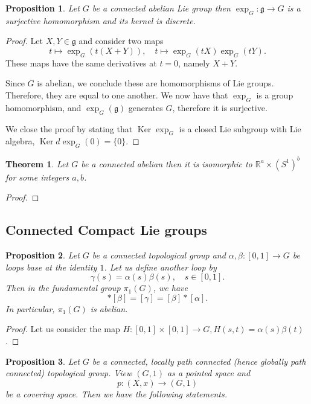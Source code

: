 \documentclass{article}
\newtheorem{theorem}{Theorem}[section]
\newtheorem{proposition}{Proposition}[section]
\numberwithin{equation}{section}
\DeclareMathOperator{\Ker}{Ker}
\begin{document}
\begin{proposition}
Let $G$ be a connected abelian Lie group then $\exp_G:\mathfrak{g}\to G$ is a surjective homomorphism and its kernel is discrete.
\end{proposition}

\begin{proof}
Let $X,Y\in\mathfrak{g}$ and consider two maps
\begin{equation*}
t\mapsto\exp_G(t(X+Y)),\quad t\mapsto\exp_G(tX)\exp_G(tY).
\end{equation*}
These maps have the same derivatives at $t=0$, namely $X+Y$.\\ %
\par Since $G$ is abelian, we conclude these are homomorphisms of Lie groups. Therefore, they are equal to one another. We now have that $\exp_G$ is a group homomorphism, and $\exp_G(\mathfrak{g})$ generates $G$, therefore it is surjective. \\
\par We close the proof by stating that $\Ker\exp_G$ is a closed Lie subgroup with Lie algebra, $\Ker d\exp_G(0)=\{0\}$.
\end{proof}

\begin{theorem}
Let $G$ be a connected abelian then it is isomorphic to $\mathbb{R}^a\times (S^1)^b$ for some integers $a,b$.
\end{theorem}

\begin{proof}
\end{proof}

\subsection{Connected Compact Lie groups}

\begin{proposition}
Let $G$ be a connected topological group and $\alpha,\beta:[0,1]\to G$ be loops base at the identity $1$. Let us define another loop by
\begin{equation*}
\gamma(s) = \alpha(s)\beta(s), \quad s\in[0,1].
\end{equation*}
Then in the fundamental group $\pi_1(G)$,  we have
\begin{equation*}
[\alpha]*[\beta] = [\gamma]=[\beta]*[\alpha].
\end{equation*}
In particular, $\pi_1(G)$ is abelian.
\end{proposition}

\begin{proof}
Let us consider the map $H:[0,1]\times[0,1]\to G, H(s,t)=\alpha(s)\beta(t)$. 
\end{proof}

\begin{proposition}
Let $G$ be a connected, locally path connected (hence globally path connected) topological group. View $(G,1)$ as a pointed space and 
\begin{equation*}
p:(X,x)\to(G,1)
\end{equation*}
be a covering space. Then we have the following statements.
\end{proposition}
\end{document}
